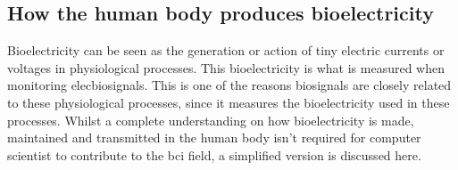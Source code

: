\begingroup
\setlength{\tabcolsep}{6pt} %
\renewcommand{\arraystretch}{2} %
\begin{table}[]
    \captionsetup{width=0.8\linewidth}
    \captionsetup{justification=centering}
    \caption{Some of the different energy forms in living beings and the measurable biosignals they produce. Data from \citet{biosignal_definition}.}
    \label{tab:biomedical_signals_energy_forms}
\end{table}
\endgroup


\subsection{How the human body produces bioelectricity}
\label{subsec:biomedical_signals_biosignals_in_human_how}

Bioelectricity can be seen as the generation or action of tiny electric currents or
voltages in physiological processes.
This bioelectricity is what is measured when monitoring \glspl{elecbiosignal}.
This is one of the reasons \glspl{biosignal} are closely related to these physiological processes, since it measures the bioelectricity used in these processes.
Whilst a complete understanding on how bioelectricity is made, maintained and transmitted in the human body isn't required for computer scientist to contribute to the \gls{bci} field, a simplified version is discussed here. 

